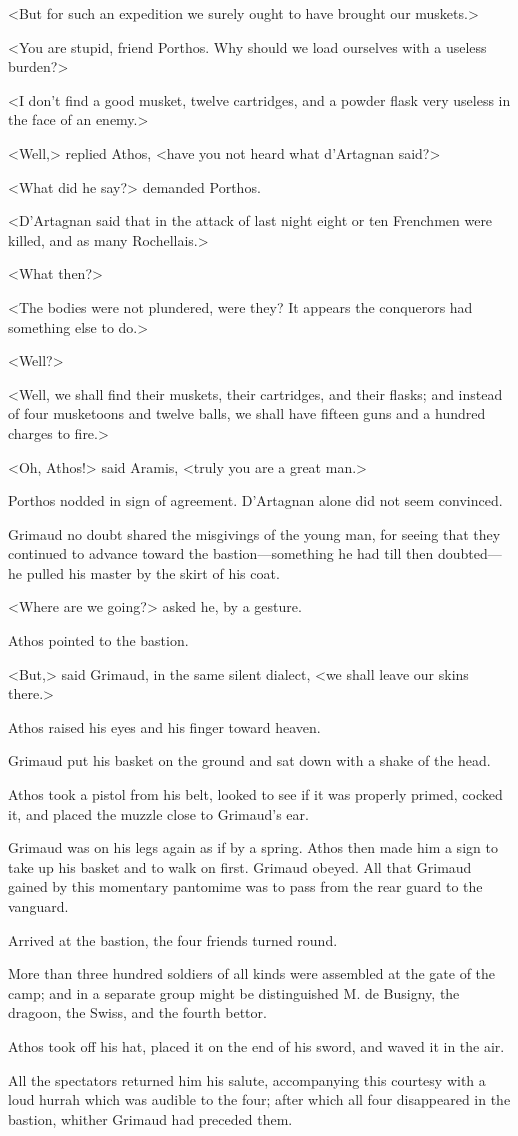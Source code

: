 <But for such an expedition we surely ought to have brought our muskets.> 

<You are stupid, friend Porthos. Why should we load ourselves with a useless burden?> 

<I don't find a good musket, twelve cartridges, and a powder flask very useless in the face of an enemy.> 

<Well,> replied Athos, <have you not heard what d'Artagnan said?> 

<What did he say?> demanded Porthos. 

<D'Artagnan said that in the attack of last night eight or ten Frenchmen were killed, and as many Rochellais.> 

<What then?> 

<The bodies were not plundered, were they? It appears the conquerors had something else to do.> 

<Well?> 

<Well, we shall find their muskets, their cartridges, and their flasks; and instead of four musketoons and twelve balls, we shall have fifteen guns and a hundred charges to fire.> 

<Oh, Athos!> said Aramis, <truly you are a great man.> 

Porthos nodded in sign of agreement. D'Artagnan alone did not seem convinced. 

Grimaud no doubt shared the misgivings of the young man, for seeing that they continued to advance toward the bastion---something he had till then doubted---he pulled his master by the skirt of his coat. 

<Where are we going?> asked he, by a gesture. 

Athos pointed to the bastion. 

<But,> said Grimaud, in the same silent dialect, <we shall leave our skins there.> 

Athos raised his eyes and his finger toward heaven. 

Grimaud put his basket on the ground and sat down with a shake of the head. 

Athos took a pistol from his belt, looked to see if it was properly primed, cocked it, and placed the muzzle close to Grimaud's ear. 

Grimaud was on his legs again as if by a spring. Athos then made him a sign to take up his basket and to walk on first. Grimaud obeyed. All that Grimaud gained by this momentary pantomime was to pass from the rear guard to the vanguard. 

Arrived at the bastion, the four friends turned round. 

More than three hundred soldiers of all kinds were assembled at the gate of the camp; and in a separate group might be distinguished M. de Busigny, the dragoon, the Swiss, and the fourth bettor. 

Athos took off his hat, placed it on the end of his sword, and waved it in the air. 

All the spectators returned him his salute, accompanying this courtesy with a loud hurrah which was audible to the four; after which all four disappeared in the bastion, whither Grimaud had preceded them.